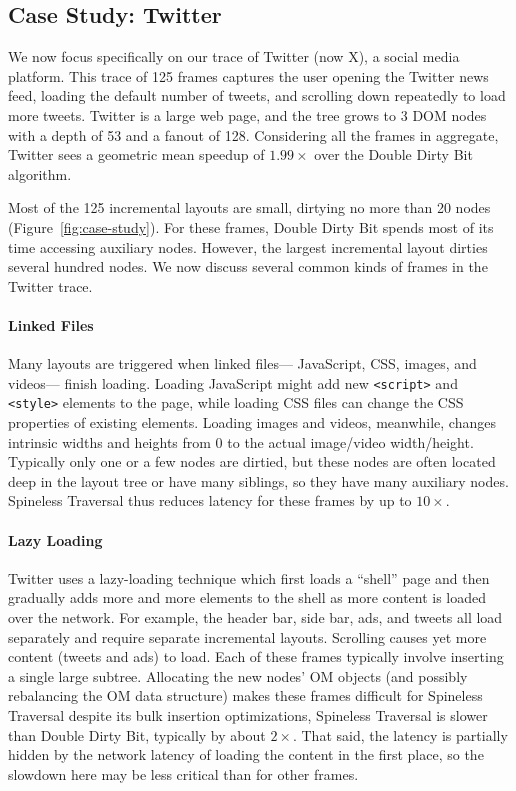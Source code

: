 \subsection{Case Study: Twitter}

We now focus specifically
  on our trace of Twitter (now X), a social media platform.
This trace of 125 frames captures the user
  opening the Twitter news feed,
  loading the default number of tweets,
  and scrolling down repeatedly to load more tweets.
Twitter is a large web page,
  and the tree grows to 3 DOM nodes
  with a depth of 53 and a fanout of 128. 
Considering all the frames in aggregate,
  Twitter sees a geometric mean speedup of $1.99\times$ 
  over the Double Dirty Bit algorithm.

Most of the 125 incremental layouts are small,
  dirtying no more than 20 nodes (Figure~\ref{fig:case-study}).
For these frames,
  Double Dirty Bit spends most of its time
  accessing auxiliary nodes.
However, the largest incremental layout
  dirties several hundred nodes.
We now discuss several common kinds of frames
  in the Twitter trace.

\paragraph{Linked Files}
Many layouts are triggered when linked files---%
  JavaScript, CSS, images, and videos---%
  finish loading.
Loading JavaScript might add
  new \texttt{<script>} and \texttt{<style>} elements to the page,
  while loading CSS files can change the CSS properties
  of existing elements.
Loading images and videos, meanwhile,
  changes intrinsic widths and heights
  from 0 to the actual image/video width/height.
Typically only one or a few nodes are dirtied,
  but these nodes are often located deep in the layout tree
  or have many siblings,
  so they have many auxiliary nodes.
Spineless Traversal thus reduces latency for these frames
  by up to $10\times$.
 
\paragraph{Lazy Loading}
Twitter uses a lazy-loading technique
  which first loads a ``shell'' page
  and then gradually adds more and more elements to the shell
  as more content is loaded over the network.
For example, the header bar, side bar, ads, and tweets
  all load separately and require separate incremental layouts.
Scrolling causes yet more content (tweets and ads) to load.
Each of these frames typically involve inserting
  a single large subtree.
Allocating the new nodes' OM objects
  (and possibly rebalancing the OM data structure)
  makes these frames difficult for Spineless Traversal
  despite its bulk insertion optimizations,
  Spineless Traversal is slower than Double Dirty Bit,
  typically by about $2\times$.
That said, the latency
  is partially hidden by the network latency
  of loading the content in the first place,
  so the slowdown here may be less critical
  than for other frames.

